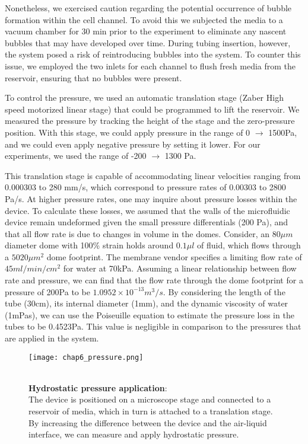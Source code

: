 Nonetheless, we exercised caution regarding the potential occurrence of bubble formation within the cell channel. To avoid this we subjected the media to a vacuum chamber for 30 \unit{\minute} prior to the experiment to eliminate any nascent bubbles that may have developed over time. During tubing insertion, however, the system posed a risk of reintroducing bubbles into the system. To counter this issue, we employed the two inlets for each channel to flush fresh media from the reservoir, ensuring that no bubbles were present.

To control the pressure, we used an automatic translation stage (Zaber High speed motorized linear stage) that could be programmed to lift the reservoir. We measured the pressure by tracking the height of the stage and the zero-pressure position. With this stage, we could apply pressure in the range of 0 $\rightarrow$ 1500\unit{\pascal}, and we could even apply negative pressure by setting it lower. For our experiments, we used the range of -200 $\rightarrow$ 1300 \unit{\pascal}.

This translation stage is capable of accommodating linear velocities ranging from 0.000303 to 280 mm/s, which correspond to pressure rates of 0.00303 to 2800 Pa/s. At higher pressure rates, one may inquire about pressure losses within the device. To calculate these losses, we assumed that the walls of the microfluidic device remain undeformed given the small pressure differentials (200 Pa), and that all flow rate is due to changes in volume in the domes. Consider, an $80 \mu m$ diameter dome with 100\% strain holds around $0.1 \mu l$ of fluid, which flows through a $5020\mu m^2$ dome footprint. The membrane vendor specifies a limiting flow rate of $45ml/min/cm^2$ for water at 70kPa. Assuming a linear relationship between flow rate and pressure, we can find that the flow rate through the dome footprint for a pressure of 200Pa to be $1.0952 \times 10^{-13} m^3/s$. By considering the length of the tube (30cm), its internal diameter (1mm), and the dynamic viscosity of water (1mPas), we can use the Poiseuille equation to estimate the pressure loss in the tubes to be 0.4523Pa. This value is negligible in comparison to the pressures that are applied in the system.

\begin{figure}
	\begin{minipage}[c]{0.6\textwidth}
		\texttt{[image: chap6\_pressure.png]}
	\end{minipage}\hfill
	\begin{minipage}[c]{0.35\textwidth}
		\caption{\\ \textbf{Hydrostatic pressure application}:\\ The device is positioned on a microscope stage and connected to a reservoir of media, which in turn is attached to a translation stage. By increasing the difference between the device and the air-liquid interface, we can measure and apply hydrostatic pressure.
		} \label{fig_6_3}
	\end{minipage}
\end{figure}


